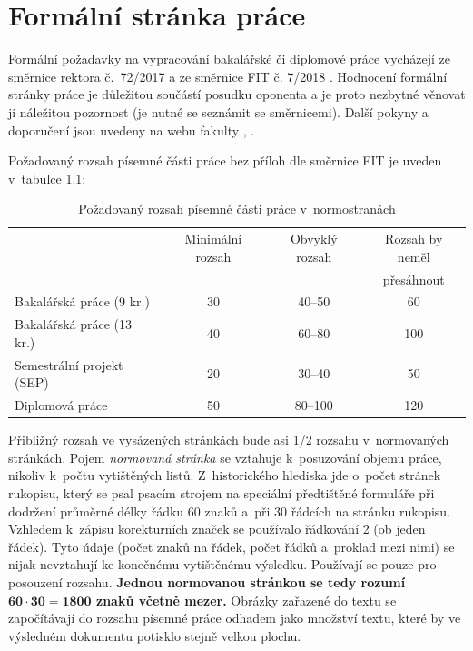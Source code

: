 \chapter{Formální stránka práce}
\label{formality}

Formální požadavky na vypracování bakalářské či diplomové práce vycházejí ze směrnice rektora č.~72/2017 \cite{smernice} a ze směrnice FIT č. 7/2018 \cite{smerniceFIT}. Hodnocení formální stránky práce je důležitou součástí posudku oponenta a je proto nezbytné věnovat jí náležitou pozornost (je nutné se seznámit se směrnicemi). Další pokyny a doporučení jsou uvedeny na webu fakulty \cite{formalniBP}, \cite{formalniDP}.

Požadovaný rozsah písemné části práce bez příloh dle směrnice FIT \cite{smerniceFIT} je uveden v~tabulce \ref{rozsah}: 

\begin{table}[hbt]
\centering
\caption{Požadovaný rozsah písemné části práce v~normostranách}
\label{rozsah}
\begin{tabular}{|l|c|c|c|}
\hline
 & Minimální rozsah & Obvyklý rozsah & Rozsah by neměl  \\
 &  &  & přesáhnout  \\ \hline
Bakalářská práce (9 kr.) & 30 & 40--50 & 60 \\ \hline
Bakalářská práce (13 kr.) & 40 & 60--80 & 100 \\ \hline
Semestrální projekt (SEP) & 20 & 30--40 & 50 \\ \hline
Diplomová práce & 50 & 80--100 & 120 \\ \hline
\end{tabular}
\end{table}
Přibližný rozsah ve vysázených stránkách bude asi 1/2 rozsahu v~normovaných stránkách. Pojem {\it normovaná stránka} se vztahuje k~posuzování objemu práce, nikoliv k~počtu vytištěných listů. Z~historického hlediska jde o~počet stránek rukopisu, který se psal psacím strojem na speciální předtištěné formuláře při dodržení průměrné délky řádku 60 znaků a~při 30 řádcích na stránku rukopisu. Vzhledem k~zápisu korekturních značek se používalo řádkování 2 (ob jeden řádek). Tyto údaje (počet znaků na řádek, počet řádků a~proklad mezi nimi) se nijak nevztahují ke konečnému vytištěnému výsledku. Používají se pouze pro posouzení rozsahu. \textbf{Jednou normovanou stránkou se tedy rozumí $\mathbf{60\cdot 30 = 1800}$ znaků včetně mezer.} Obrázky zařazené do textu se započítávají do rozsahu písemné práce odhadem jako množství textu, které by ve výsledném dokumentu potisklo stejně velkou plochu. 

